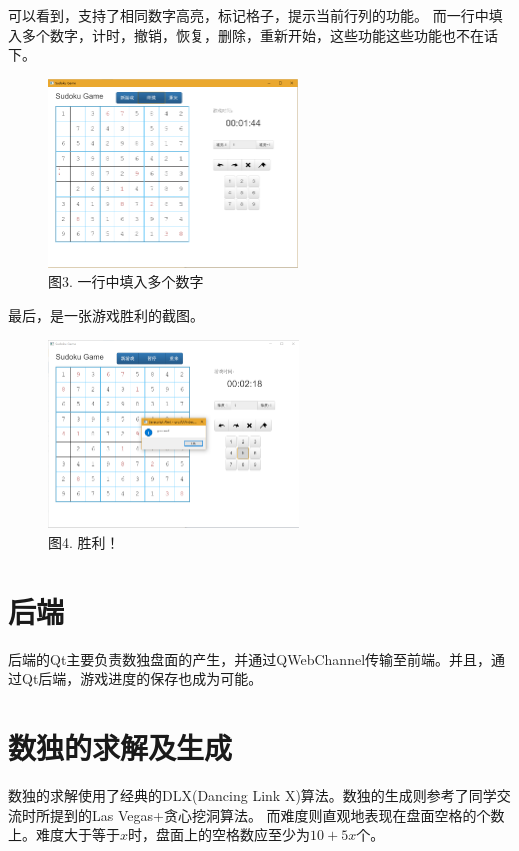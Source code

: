 \documentclass[a4paper,10pt]{article}
\begin{document}
    可以看到，支持了相同数字高亮，标记格子，提示当前行列的功能。
    而一行中填入多个数字，计时，撤销，恢复，删除，重新开始，这些功能这些功能也不在话下。

    \begin{figure}
        \centering
        \includegraphics[height=5cm]{playing_lvl1.png}
        \caption{图3. 一行中填入多个数字}
    \end{figure}

    最后，是一张游戏胜利的截图。

    \begin{figure}
        \centering
        \includegraphics[height=5cm]{win_lvl1.png}
        \caption{图4. 胜利！}
    \end{figure}
    \section{后端}

    后端的Qt主要负责数独盘面的产生，并通过QWebChannel传输至前端。并且，通过Qt后端，游戏进度的保存也成为可能。

    \section{数独的求解及生成}

    数独的求解使用了经典的DLX(Dancing Link X)算法。数独的生成则参考了同学交流时所提到的Las Vegas+贪心挖洞算法。
    而难度则直观地表现在盘面空格的个数上。难度大于等于$x$时，盘面上的空格数应至少为$10+5x$个。
\end{document}
